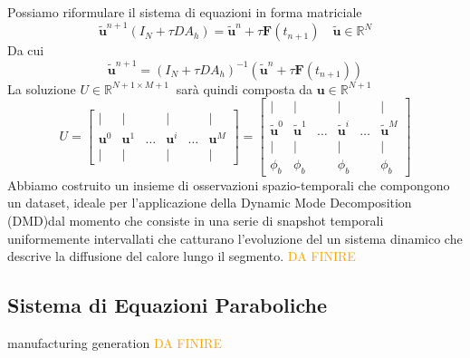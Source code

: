 \documentclass[11pt]{article}
\newcommand{\R}{\mathbb{R}}
\begin{document}
Possiamo riformulare il sistema di equazioni in forma matriciale
\[
\mathbf{\tilde{u}}^{n+1}(I_N+\tau D A_h)=\mathbf{\tilde{u}}^n+ \tau \mathbf{F}(t_{n+1})
\quad \mathbf{\tilde{u}} \in \R^N
\]
Da cui 
\[
\mathbf{\tilde{u}}^{n+1}=(I_N+\tau D A_h)^{-1}(\mathbf{\tilde{u}}^n+\tau \mathbf{F}(t_{n+1}))
\]
La soluzione \(U \in \R^{N+1 \times M+1} \ \) sarà quindi composta da \( \mathbf{u} \in \R^{N+1} \)
\[
U= \begin{bmatrix}
| & | & & | &  & |  \\
\mathbf{u}^0 & \mathbf{u}^1 & \dots & \mathbf{u}^i & \dots &\mathbf{u}^M \\
| & | & & | &  & | 
\end{bmatrix}=
\begin{bmatrix}
| & | & & | &  & |  \\
\mathbf{\tilde{u}}^0 & \mathbf{\tilde{u}}^1 & \dots & \mathbf{\tilde{u}}^i & \dots &\mathbf{\tilde{u}}^M \\
| & | & & | &  & | \\
\phi_b & \phi_b & & \phi_b & & \phi_b
\end{bmatrix}
\]
Abbiamo costruito un insieme di osservazioni spazio-temporali che compongono un dataset, ideale per l'applicazione della Dynamic Mode Decomposition (DMD)dal momento che consiste in una serie di snapshot temporali uniformemente intervallati che catturano l'evoluzione del un sistema dinamico che descrive la diffusione del calore lungo il segmento.
\textcolor{orange}{DA FINIRE}
\subsection{Sistema di Equazioni Paraboliche}
manufacturing generation
\textcolor{orange}{DA FINIRE}
\end{document}
